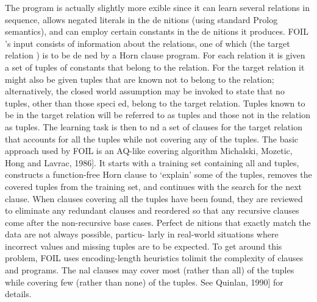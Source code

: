 The program is actually slightly more exible since it can learn several relations in sequence, allows negated literals in the de nitions (using standard Prolog semantics), and can employ certain constants in the de nitions it produces.
FOIL 's input consists of information about the relations, one of which (the target
relation ) is to be de ned by a Horn clause program. For each relation it is given
a set of tuples of constants that belong to the relation. For the target relation
it might also be given tuples that are known not to belong to the relation;
alternatively, the closed world assumption may be invoked to state that no tuples,
other than those speci ed, belong to the target relation. Tuples known to be in
the target relation will be referred to as tuples and those not in the relation as
tuples. The learning task is then to nd a set of clauses for the target relation
that accounts for all the tuples while not covering any of the tuples.
The basic approach used by FOIL is an AQ-like covering algorithm Michalski,
Mozetic, Hong and Lavrac, 1986]. It starts with a training set containing all
and tuples, constructs a function-free Horn clause to `explain' some of the
tuples, removes the covered tuples from the training set, and continues with
the search for the next clause. When clauses covering all the tuples have been
found, they are reviewed to eliminate any redundant clauses and reordered so
that any recursive clauses come after the non-recursive base cases.
Perfect de nitions that exactly match the data are not always possible, particu-
larly in real-world situations where incorrect values and missing tuples are to be
expected. To get around this problem, FOIL uses encoding-length heuristics tolimit the complexity of clauses and programs. The nal clauses may cover most
(rather than all) of the tuples while covering few (rather than none) of the
tuples. See Quinlan, 1990] for details.
